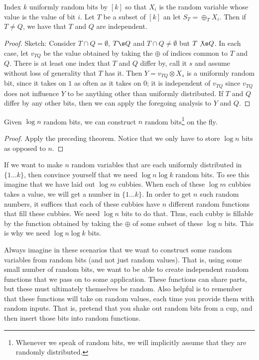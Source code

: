 \documentclass[../main.tex]{subfiles}
\begin{document}
\begin{theorem}
    Index $k$ uniformly random bits by $[k]$ so that $X_{i}$ is the random variable 
    whose value is the value of bit $i$. Let $T$ be a subset of $[k]$ an let
    $S_{T} = \oplus_{T} X_{i}$. Then if $T \not = Q$, we have that $T$ and $Q$ are independent.
\end{theorem}

\begin{proof}
    Sketch: Consider $T \cap Q = \emptyset$, $T \s Q$ and $T \cap Q \not = \emptyset$ but $T \not \s Q$. In each case, let $v_{TQ}$ be the value obtained by taking the $\oplus$ of indices common to $T$ and $Q$. There is at least one index that $T$ and $Q$ differ by, call it $s$ and assume without loss of generality that $T$ has it. Then $Y = v_{TQ} \otimes X_s$ is a uniformly random bit, since it takes on $1$ as often as it takes on $0$; it is independent of $v_{TQ}$ since $v_{TQ}$ does not influence $Y$ to be anything other than uniformly distributed. If $T$ and $Q$ differ by any other bits, then we can apply the foregoing analysis to $Y$ and $Q$.
\end{proof}

\begin{theorem}
    Given $\log n$ random bits, we can construct $n$ random bits\footnote{Whenever we speak of random bits, we will implicitly assume that they are randomly distributed.} on the fly. 
\end{theorem}

\begin{proof}
    Apply the preceding theorem. Notice that we only have to store $\log n$ bits as opposed to $n$.
\end{proof}

\begin{remark}
    If we want to make $n$ random variables that are each uniformly distributed in $\{1 \dots k\}$, then convince yourself that we need $\log n \log k$ random bits. To see this imagine that we have laid out $\log m$ cubbies. When each of these $\log m$ cubbies takes a value, we will get a number in $\{1 \dots k\}$. In order to get $n$ such random numbers, it suffices that each of these cubbies have $n$ different random functions that fill these cubbies. We need $\log n$ bits to do that. Thus, each cubby is fillable by the function obtained by taking the $\oplus$ of some subset of these $\log n$ bits. This is why we need $\log n \log k$ bits. 
\end{remark}

\begin{remark}
    Always imagine in these scenarios that we want to construct some
    random variables from random bits (and not just random values). That is, using some small number of random bits, we want to be able to create independent random functions that we pass on to some application. These functions can share parts, but these must ultimately themselves be random. Also helpful is to remember that these functions will take on random values, each time you provide them with random inputs. That is, pretend that you shake out random bits from a cup, and then insert those bits into random functions.
\end{remark}
\end{document}
